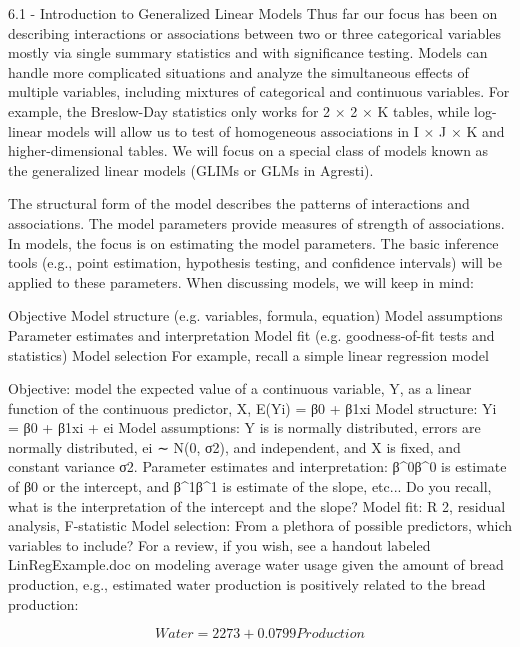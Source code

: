 
6.1 - Introduction to Generalized Linear Models
Thus far our focus has been on describing interactions or associations between two or three categorical variables mostly via single summary statistics and with significance testing. Models can handle more complicated situations and analyze the simultaneous effects of multiple variables, including mixtures of categorical and continuous variables. For example, the Breslow-Day statistics only works for 2 × 2 × K tables, while log-linear models will allow us to test of homogeneous associations in I × J × K and higher-dimensional tables. We will focus on a special class of models known as the generalized linear models (GLIMs or GLMs in Agresti).

The structural form of the model describes the patterns of interactions and associations. The model parameters provide measures of strength of associations. In models, the focus is on estimating the model parameters. The basic inference tools (e.g., point estimation, hypothesis testing, and confidence intervals) will be applied to these parameters. When discussing models, we will keep in mind:

Objective
Model structure (e.g. variables, formula, equation)
Model assumptions
Parameter estimates and interpretation
Model fit (e.g. goodness-of-fit tests and statistics)
Model selection
For example, recall a simple linear regression model

Objective: model the expected value of a continuous variable, Y, as a linear function of the continuous predictor, X, E(Yi) = β0 + β1xi
Model structure: Yi = β0 + β1xi + ei
Model assumptions: Y is is normally distributed, errors are normally distributed, ei ∼ N(0, σ2), and independent, and X is fixed, and constant variance σ2.
Parameter estimates and interpretation: β^0β^0 is estimate of β0 or the intercept, and β^1β^1 is estimate of the slope, etc... Do you recall, what is the interpretation of the intercept and the slope?
Model fit: R 2, residual analysis, F-statistic
Model selection: From a plethora of possible predictors, which variables to include?
For a review, if you wish, see a handout labeled LinRegExample.doc on modeling average water usage given the amount of bread production, e.g., estimated water production is positively related to the bread production:

\[Water = 2273 + 0.0799 Production\]

